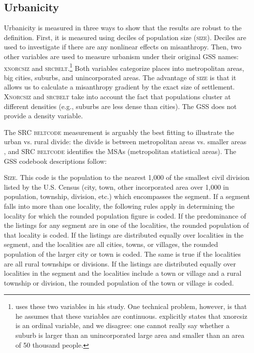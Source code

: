 \documentclass[11pt, letterpaper]{article}
\begin{document}
\begin{spacing}{1.4}
 
\subsection*{Urbanicity}

Urbanicity is measured in three ways to show that the
results are robust to the definition. First, it is measured using deciles of population size
(\textsc{size}). Deciles are used to investigate if there are any nonlinear
effects on misanthropy. Then, two other variables are used to measure urbanism under their original GSS names: \textsc{xnorcsiz} and \textsc{srcbelt}.\footnote{\citet{wilson85} uses these two variables in his study. One technical problem, however, is that he assumes that these variables are continuous. \citet{wilson85} explicitly states that xnorcsiz is an ordinal variable, and we disagree: one cannot really say whether a suburb is larger than an unincorporated large area and smaller than an area of 50 thousand people.} Both variables categorize places into metropolitan areas, big cities, suburbs, and  unincorporated areas. The advantage of \textsc{size} is that it allows us to calculate a misanthropy 
 gradient by the exact size of settlement. \textsc{Xnorcsiz} and \textsc{srcbelt} take into account the fact that populations cluster at different densities (e.g., suburbs are less dense than cities). The GSS does not provide a density variable. 

The \textsc{SRC beltcode} measurement is arguably the best fitting to illustrate the
urban vs. rural divide: the divide is between metropolitan areas vs. smaller areas
\citep{hansonCityJournalautumn15}, and \textsc{SRC beltcode} identifies the MSAs
(metropolitan statistical areas). The GSS codebook descriptions follow: 

\textsc{Size}. This code is the population to the nearest 1,000 of the smallest civil
division listed by the U.S. Census (city, town, other incorporated
area over 1,000 in population, township, division, etc.) which
encompasses the segment. If a segment falls into more than one
locality, the following rules apply in determining the locality for
which the rounded population figure is coded.
If the predominance of the listings for any segment are in one of the
localities, the rounded population of that locality is coded.
If the listings are distributed equally over localities in the
segment, and the localities are all cities, towns, or villages, the
rounded population of the larger city or town is coded. The same is
true if the localities are all rural townships or divisions.
If the listings are distributed equally over localities in the segment
and the localities include a town or village and a rural township or
division, the rounded population of the town or village is coded.


\end{spacing}
\end{document}
